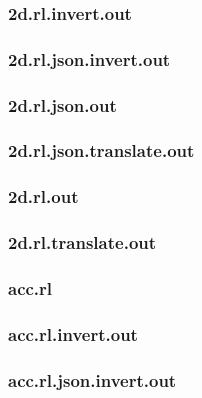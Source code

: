 \subsubsection{2d.rl.invert.out}
\label{app:2d_rl.invert.out}

\subsubsection{2d.rl.json.invert.out}
\label{app:2d_rl.json.invert.out}

\subsubsection{2d.rl.json.out}
\label{app:2d_rl.json.out}

\subsubsection{2d.rl.json.translate.out}
\label{app:2d_rl.json.translate.out}

\subsubsection{2d.rl.out}
\label{app:2d_rl.out}

\subsubsection{2d.rl.translate.out}
\label{app:2d_rl.translate.out}

\subsubsection{acc.rl}
\label{app:acc_rl}

\subsubsection{acc.rl.invert.out}
\label{app:acc_rl.invert.out}

\subsubsection{acc.rl.json.invert.out}
\label{app:acc_rl.json.invert.out}

